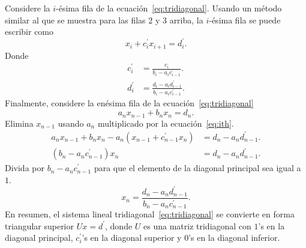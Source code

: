 \begin{frame}
	\frametitle{\insertsection}

	Considere la $i$-ésima fila de la ecuación~\eqref{eq:tridiagonal}.
	Usando un método similar al que se muestra para las filas $2$ y $3$
	arriba, la $i$-ésima fila se puede escribir como
	\begin{equation}\label{eq:ith}
		x_{i}+
		c^{\prime}_{i}x_{i+1}=
		d^{\prime}_{i}.
	\end{equation}
	Donde
	\begin{align*}
		c^{\prime}_{i} & =
		\frac{c_{i}}{b_{i}-a_{i}c^{\prime}_{i-1}}. \\
		d^{\prime}_{i} & =
		\frac{d_{i}-a_{i}d^{\prime}_{i-1}}{b_{i}-a_{i}c^{\prime}_{i-1}}.
	\end{align*}
	Finalmente, considere la enésima fila de la ecuación~\eqref{eq:tridiagonal}
	\begin{equation*}
		a_{n}x_{n-1}+
		b_{n}x_{n}=
		d_{n}.
	\end{equation*}
	Elimina $x_{n-1}$ usando $a_{n}$ multiplicado por la ecuación~\eqref{eq:ith}.
	\begin{align*}
		a_{n}x_{n-1}+b_{n}x_{n}-a_{n}\left(x_{n-1}+c^{\prime}_{n-1}x_{n}\right) & =
		d_{n}-a_{n}d^{\prime}_{n-1}.                                                \\
		\left(b_{n}-a_{n}c^{\prime}_{n-1}\right)x_{n}                           & =
		d_{n}-a_{n}d^{\prime}_{n-1}.
	\end{align*}
	Divida por $b_{n}-a_{n}c^{\prime}_{n-1}$ para que el elemento de la
	diagonal principal sea igual a $1$.
	\begin{equation*}
		x_{n}=
		\frac{d_{n}-a_{n}d^{\prime}_{n-1}}{b_{n}-a_{n}c^{\prime}_{n-1}}.
	\end{equation*}
	En resumen, el sistema lineal tridiagonal~\eqref{eq:tridiagonal} se
	convierte en forma triangular superior $Ux=d^{\prime}$, donde $U$
	es una matriz tridiagonal con $1$'s en la diagonal principal,
	$c^{\prime}_{i}$'s en la diagonal superior y $0$'s en la diagonal
	inferior.
\end{frame}

